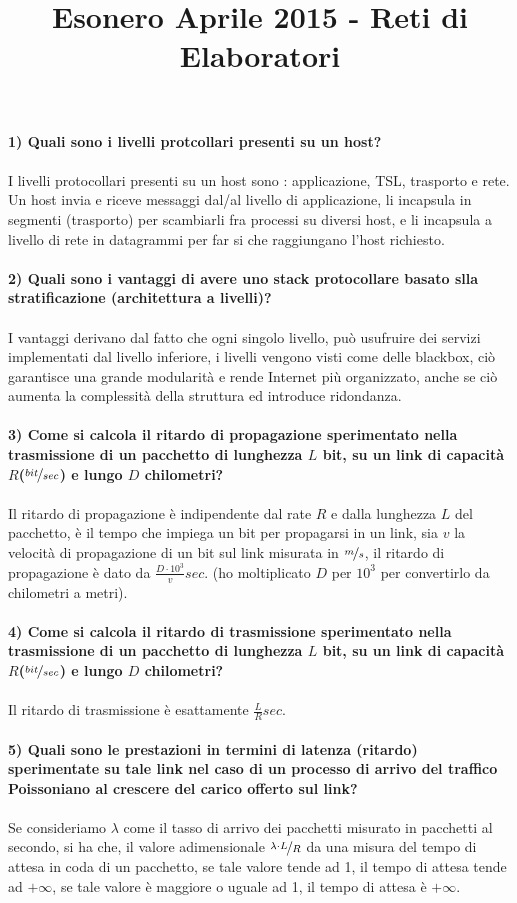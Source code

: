 \documentclass[12pt, letterpaper]{article}
\title{Esonero Aprile 2015 - Reti di Elaboratori}
\date{\vspace{-5ex}}
\newcommand{\acc}{\\\hphantom{}\\}
\begin{document}
\maketitle
\textbf{1) Quali sono i livelli protcollari presenti su un host?}\acc 
I livelli protocollari presenti su un host sono : applicazione, TSL, trasporto e rete. Un host invia e riceve messaggi dal/al livello 
di applicazione, li incapsula in segmenti (trasporto) per scambiarli fra processi su diversi host, e li incapsula a livello 
di rete in datagrammi per far si che raggiungano l'host richiesto.\acc


\textbf{2) Quali sono i vantaggi di avere uno stack protocollare basato slla stratificazione (architettura a livelli)?}\acc 
I vantaggi derivano dal fatto che ogni singolo livello, può usufruire dei servizi implementati dal livello inferiore, i livelli 
vengono visti come delle blackbox, ciò garantisce una grande modularità e rende Internet più organizzato, anche se ciò aumenta la 
complessità della struttura ed introduce ridondanza.\acc 


\textbf{3) Come si calcola il ritardo di propagazione sperimentato nella trasmissione di un pacchetto di lunghezza $L$ bit, su un link 
di capacità $R$($\nicefrac{bit}{sec}$) e lungo $D$ chilometri?}\acc 
Il ritardo di propagazione è indipendente dal rate $R$ e dalla lunghezza $L$ del pacchetto, è il tempo che impiega un bit per 
propagarsi in un link, sia $v$ la velocità di propagazione di un bit sul link misurata in $\nicefrac{m}{s}$, il ritardo di propagazione è dato 
da $\frac{D\cdot 10^{3}}{v} sec$. (ho moltiplicato $D$ per $10^{3}$ per convertirlo da chilometri a metri).\acc 


\textbf{4) Come si calcola il ritardo di trasmissione sperimentato nella trasmissione di un pacchetto
di lunghezza $L$ bit, su un link di capacità $R$($\nicefrac{bit}{sec}$) e lungo $D$ chilometri?}\acc 
Il ritardo di trasmissione è esattamente $\frac{L}{R}sec$.\acc 


\textbf{5) Quali sono le prestazioni in termini di latenza (ritardo) sperimentate su tale link nel caso di un 
processo di arrivo del traffico Poissoniano al crescere del carico offerto sul link?}\acc 
Se consideriamo $\lambda$ come il tasso di arrivo dei pacchetti misurato in pacchetti al secondo, si ha che, il valore 
adimensionale $\nicefrac{\lambda\cdot L}{R}$ da una misura del tempo di attesa in coda di un pacchetto, se tale valore 
tende ad 1, il tempo di attesa tende ad $+\infty$, se tale valore è maggiore o uguale ad 1, il tempo di attesa è $+\infty$.\acc 
\end{document}
